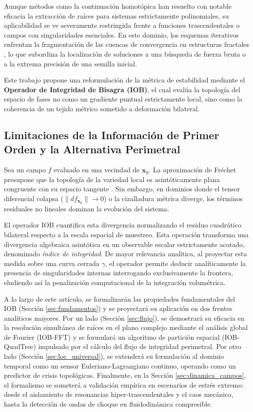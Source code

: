 \documentclass[11pt]{article}
\begin{document}
Aunque métodos como la continuación homotópica \cite{sommese2005numerical} han resuelto con notable eficacia la extracción de raíces para sistemas estrictamente polinomiales, su aplicabilidad se ve severamente restringida frente a funciones trascendentales o campos con singularidades esenciales. En este dominio, los esquemas iterativos enfrentan la fragmentación de las cuencas de convergencia en estructuras fractales \cite{smale1981fundamental, kravanja2000computing}, lo que subordina la localización de soluciones a una búsqueda de fuerza bruta o a la extrema precisión de una semilla inicial.

Este trabajo propone una reformulación de la métrica de estabilidad mediante el \textbf{Operador de Integridad de Bisagra (IOB)}, el cual evalúa la topología del espacio de fases no como un gradiente puntual estrictamente local, sino como la coherencia de un tejido métrico sometido a deformación bilateral. 

\newpage
\subsection{Limitaciones de la Información de Primer Orden y la Alternativa Perimetral}

Sea un campo $f$ evaluado en una vecindad de $\mathbf{x}_0$. La aproximación de Fréchet presupone que la topología de la variedad local es asintóticamente plana congruente con su espacio tangente \cite{lee2012smooth}. Sin embargo, en dominios donde el tensor diferencial colapsa ($\|df_{\mathbf{x}_0}\| \to 0$) o la cizalladura métrica diverge, los términos residuales no lineales dominan la evolución del sistema. 

El operador IOB cuantifica esta divergencia normalizando el residuo cuadrático bilateral respecto a la escala espacial de muestreo. Esta operación transforma una divergencia algebraica asintótica en un observable escalar estrictamente acotado, denominado \textit{índice de integridad}. De mayor relevancia analítica, al proyectar esta medida sobre una curva cerrada $\gamma$, el operador permite deducir analíticamente la presencia de singularidades internas interrogando exclusivamente la frontera, eludiendo así la penalización computacional de la integración volumétrica.

A lo largo de este artículo, se formalizarán las propiedades fundamentales del IOB (Sección \ref{sec:fundamentos}) y se proyectará su aplicación en dos frentes analíticos mayores. Por un lado (Sección \ref{sec:flujo}), se demostrará su eficacia en la resolución simultánea de raíces en el plano complejo mediante el análisis global de Fourier (IOB-FFT) y se formulará un algoritmo de partición espacial (IOB-QuadTree) impulsado por el cálculo del flujo de integridad perimetral. Por otro lado (Sección \ref{sec:loc_universal}), se extenderá su formulación al dominio temporal como un sensor Euleriano-Lagrangiano continuo, operando como un predictor de crisis topológicas. Finalmente, en la Sección \ref{sec:dinamica_campos}, el formalismo se someterá a validación empírica en escenarios de estrés extremo: desde el aislamiento de resonancias hiper-trascendentales y el caos mecánico, hasta la detección de ondas de choque en fluidodinámica compresible.
\end{document}
